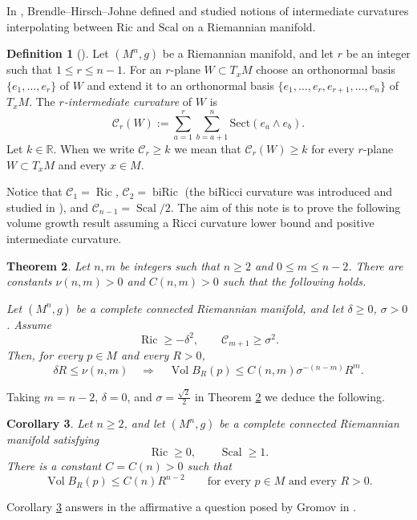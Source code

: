 \documentclass[11pt]{amsart}
\newtheorem{theorem}{Theorem}[section]
\newtheorem{corollary}[theorem]{Corollary}
\theoremstyle{definition}
\newtheorem{definition}[theorem]{Definition}
\theoremstyle{remark}
\DeclareMathOperator{\Ric}{Ric}
\DeclareMathOperator{\Scal}{Scal}
\DeclareMathOperator{\Vol}{Vol}
\newcommand{\Cint}{\mathcal C}
\begin{document}
In \cite[Definition 1.1]{BrendleHirschJohne}, Brendle--Hirsch--Johne defined and studied notions of intermediate curvatures interpolating between $\mathrm{Ric}$ and $\mathrm{Scal}$ on a Riemannian manifold. 
\begin{definition}[{\cite[Definition 1.1]{BrendleHirschJohne}}]
    Let $(M^n,g)$ be a Riemannian manifold, and let $r$ be an integer such that $1\leq r\leq n-1$. For an $r$-plane $W\subset T_xM$ choose an orthonormal basis $\{e_1,\ldots,e_r\}$ of $W$ and extend it to an orthonormal basis $\{e_1,\ldots,e_r,e_{r+1},\ldots,e_n\}$ of $T_xM$. The \textit{$r$-intermediate curvature} of $W$ is
    \begin{equation}\label{eq:C-definition}
       \Cint_r(W):=\sum_{a=1}^{r}\sum_{b=a+1}^{n}\mathrm{Sect}(e_a\wedge e_b).
\end{equation}
Let $k\in \mathbb R$. When we write $\mathcal{C}_r \geq k$ we mean that $\mathcal{C}_r(W)\geq k$ for every $r$-plane $W\subset T_xM$ and every $x\in M$.
\end{definition}
Notice that $\Cint_1=\Ric$, $\Cint_2=\operatorname{biRic}$ (the biRicci curvature was introduced and studied in \cite{ShenYe}), and
$\Cint_{n-1}=\Scal/2$. The aim of this note is to prove the following volume growth result assuming a Ricci curvature lower bound and positive intermediate curvature. 
\begin{theorem}
\label{thm:main}
Let $n,m$ be integers such that $n\geq2$ and $0\leq m\leq n-2$. There are constants $\nu(n,m)>0$ and $C(n,m)>0$ such that the following holds.

Let $(M^n,g)$ be a complete connected Riemannian manifold, and let $\delta\geq 0$, $\sigma> 0$. Assume
\[
              \Ric\geq -\delta^2,
       \qquad \mathcal{C}_{m+1}\geq\sigma^2.
\]
Then, for every $p\in M$ and every $R>0$,
\begin{equation}\label{eq:main-volume}
       \delta R \leq \nu(n,m) \quad \Longrightarrow \quad \Vol B_R(p)
       \leq C(n,m)\sigma^{-(n-m)}R^m.
\end{equation}
\end{theorem}

Taking $m=n-2$, $\delta=0$, and $\sigma=\frac{\sqrt 2}{2}$ in Theorem \ref{thm:main} we deduce the following.

\begin{corollary}\label{thm:scalar-intro}
Let $n\geq2$, and let $(M^n,g)$ be a complete connected Riemannian manifold
satisfying
\[
                         \Ric\geq0,
              \qquad     \Scal\geq1.
\]
There is a constant $C=C(n)>0$ such that
\[
        \Vol B_R(p)\leq C(n) R^{n-2}
        \qquad\text{for every }p\in M\text{ and every }R>0.
\]
\end{corollary}
Corollary \ref{thm:scalar-intro} answers in the affirmative a question posed by Gromov in \cite[\S2.A(b)]{GromovLarge}. 
\smallskip
\end{document}
